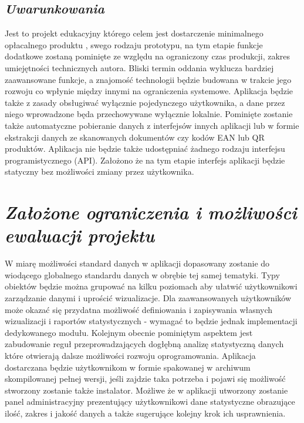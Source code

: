 \documentclass[a4paper,10pt, twoside]{report}
\newcommand{\customstylechapter}[1]{\large{\textit{#1}}}
\newcommand{\customstylesection}[1]{\textbf{\textit{#1}}}
\begin{document}
\section{\customstylesection{Uwarunkowania}}
{Jest to projekt edukacyjny którego celem jest dostarczenie minimalnego
 opłacalnego produktu \cite{MVP}, swego rodzaju prototypu, na tym etapie funkcje
 dodatkowe zostaną pominięte ze względu na ograniczony czas produkcji, zakres
 umiejętności technicznych autora. Bliski termin oddania wyklucza bardziej
 zaawansowane funkcje, a znajomość technologii będzie budowana w trakcie jego
 rozwoju co wpłynie między innymi na ograniczenia systemowe. Aplikacja będzie
 także z zasady obsługiwać wyłącznie pojedynczego użytkownika, a dane przez
 niego wprowadzone będa przechowywane wyłącznie lokalnie. Pominięte zostanie
 także automatyczne pobieranie danych z interfejsów innych aplikacji lub w
 formie ekstrakcji danych ze skanowanych dokumentów czy kodów EAN lub QR
 produktów. Aplikacja nie będzie także udostępniać żadnego rodzaju interfejsu 
programistycznego (API). Założono że na tym etapie interfejs aplikacji będzie statyczny bez
 możliwości zmiany przez użytkownika.}


\chapter{\customstylechapter{Założone ograniczenia i możliwości ewaluacji projektu}}
{W miarę możliwości standard danych w aplikacji dopasowany zostanie do wiodącego
 globalnego standardu danych w obrębie tej samej tematyki. Typy obiektów będzie
 można grupować na kilku poziomach aby ułatwić użytkownikowi zarządzanie danymi
 i uprościć wizualizacje. Dla zaawansowanych użytkowników może okazać się 
przydatna możliwość definiowania i zapisywania własnych wizualizacji i raportów 
statystycznych - wymagać to będzie jednak implementacji dedykowanego modułu. 
Kolejnym obecnie pominiętym aspektem jest zabudowanie reguł przeprowadzających 
dogłębną analizę statystyczną danych które otwierają dalsze możliwości rozwoju 
oprogramowania. Aplikacja dostarczana będzie użytkownikom w formie spakowanej w
archiwum skompilowanej pełnej wersji, jeśli zajdzie taka potrzeba i pojawi się 
możliwość stworzony zostanie także instalator. Możliwe że w aplikacji utworzony 
zostanie panel administracyjny prezentujący użytkownikowi dane statystyczne 
obrazujące ilość, zakres i jakość danych a także sugerujące kolejny krok ich 
usprawnienia.}
\end{document}
